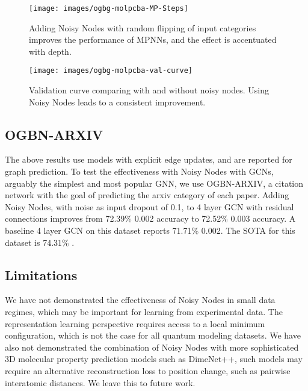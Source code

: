 \documentclass{article} \usepackage{iclr2022_conference,times}
\begin{document}
\begin{figure}[]
    \centering
    \begin{minipage}{0.45\textwidth}
        \centering
        \texttt{[image: images/ogbg-molpcba-MP-Steps]}
        \caption{Adding Noisy Nodes with random flipping of input categories improves the performance of MPNNs, and the effect is accentuated with depth.}
        \label{fig:ogbg-molpcba}
    \end{minipage}\hfill
    \begin{minipage}{0.45\textwidth}
        \centering
        \texttt{[image: images/ogbg-molpcba-val-curve]}
        \caption{Validation curve comparing with and without noisy nodes. Using Noisy Nodes leads to a consistent improvement.}
    \label{fig:molpcba_curve}
    \end{minipage}
\end{figure}



\subsection{OGBN-ARXIV}

The above results use models with explicit edge updates, and are reported for graph prediction. To test the effectiveness with Noisy Nodes with GCNs, arguably the simplest and most popular GNN, we use OGBN-ARXIV, a citation network with the goal of predicting the arxiv category of each paper. Adding Noisy Nodes, with noise as input dropout of 0.1, to 4 layer GCN with residual connections improves from 72.39\%  0.002 accuracy to 72.52\%  0.003 accuracy. A baseline 4 layer GCN on this dataset reports 71.71\%  0.002. The SOTA for this dataset is 74.31\% \citep{Sun2020AdaptiveGD}. 

\subsection{Limitations}\label{limitations}

We have not demonstrated the effectiveness of Noisy Nodes in small data regimes, which may be important for learning from experimental data. The representation learning perspective requires access to a local minimum configuration, which is not the case for all quantum modeling datasets. We have also not demonstrated the combination of Noisy Nodes with more sophisticated 3D molecular property prediction models such as DimeNet++\citep{Klicpera2020Dimenet++}, such models may require an alternative reconstruction loss to position change, such as pairwise interatomic distances. We leave this to future work.
\end{document}
